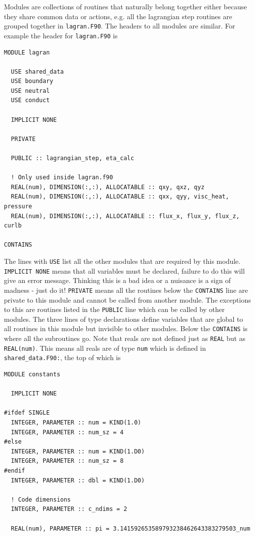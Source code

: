\documentclass[11pt]{article}
\begin{document}
Modules are collections of routines that naturally belong together either because they share common data or actions, 
e.g. all the lagrangian step routines are grouped together in \texttt{lagran.F90}. The headers to all modules are 
similar. For example the header for \texttt{lagran.F90} is

\begin{verbatim}
MODULE lagran

  USE shared_data
  USE boundary
  USE neutral
  USE conduct

  IMPLICIT NONE

  PRIVATE

  PUBLIC :: lagrangian_step, eta_calc

  ! Only used inside lagran.f90
  REAL(num), DIMENSION(:,:), ALLOCATABLE :: qxy, qxz, qyz
  REAL(num), DIMENSION(:,:), ALLOCATABLE :: qxx, qyy, visc_heat, pressure
  REAL(num), DIMENSION(:,:), ALLOCATABLE :: flux_x, flux_y, flux_z, curlb

CONTAINS
\end{verbatim}
The lines with \texttt{USE} list all the other modules that are required by this module. \texttt{IMPLICIT NONE} 
means that all variables must be declared, failure to do this will give an error message. Thinking this is a bad 
idea or a nuisance is a sign of madness - just do it! \texttt{PRIVATE} means all the routines below the \texttt{CONTAINS} 
line are private to this module and cannot be called from another module. The exceptions to this are routines listed 
in the \texttt{PUBLIC} line which can be called by other modules. The three lines of type declarations define variables 
that are global to all routines in this module but invisible to other modules. Below the \texttt{CONTAINS} is where 
all the subroutines go. Note that reals are not defined just as \texttt{REAL} but as \texttt{REAL(num)}. This means 
all reals are of type \texttt{num} which is defined in {\texttt{shared\_data.F90:}}, the top of which is
\begin{verbatim}
MODULE constants

  IMPLICIT NONE

#ifdef SINGLE
  INTEGER, PARAMETER :: num = KIND(1.0)
  INTEGER, PARAMETER :: num_sz = 4
#else
  INTEGER, PARAMETER :: num = KIND(1.D0)
  INTEGER, PARAMETER :: num_sz = 8
#endif
  INTEGER, PARAMETER :: dbl = KIND(1.D0)

  ! Code dimensions
  INTEGER, PARAMETER :: c_ndims = 2

  REAL(num), PARAMETER :: pi = 3.141592653589793238462643383279503_num
\end{verbatim}
\end{document}
